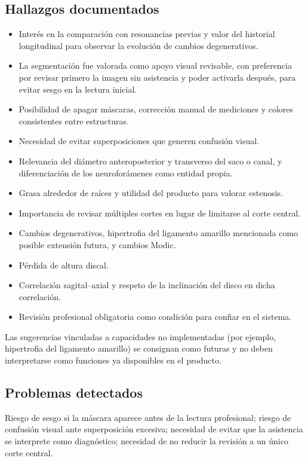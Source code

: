 \subsection*{Hallazgos documentados}
\begin{itemize}
    \item Interés en la comparación con resonancias previas y valor del historial longitudinal para observar la evolución de cambios degenerativos.
    \item La segmentación fue valorada como apoyo visual revisable, con preferencia por revisar primero la imagen sin asistencia y poder activarla después, para evitar sesgo en la lectura inicial.
    \item Posibilidad de apagar máscaras, corrección manual de mediciones y colores consistentes entre estructuras.
    \item Necesidad de evitar superposiciones que generen confusión visual.
    \item Relevancia del diámetro anteroposterior y transverso del saco o canal, y diferenciación de los neuroforámenes como entidad propia.
    \item Grasa alrededor de raíces y utilidad del producto para valorar estenosis.
    \item Importancia de revisar múltiples cortes en lugar de limitarse al corte central.
    \item Cambios degenerativos, hipertrofia del ligamento amarillo mencionada como posible extensión futura, y cambios Modic.
    \item Pérdida de altura discal.
    \item Correlación sagital--axial y respeto de la inclinación del disco en dicha correlación.
    \item Revisión profesional obligatoria como condición para confiar en el sistema.
\end{itemize}

Las sugerencias vinculadas a capacidades no implementadas (por ejemplo, hipertrofia del ligamento amarillo) se consignan como futuras y no deben interpretarse como funciones ya disponibles en el producto.

\subsection*{Problemas detectados}
Riesgo de sesgo si la máscara aparece antes de la lectura profesional; riesgo de confusión visual ante superposición excesiva; necesidad de evitar que la asistencia se interprete como diagnóstico; necesidad de no reducir la revisión a un único corte central.

